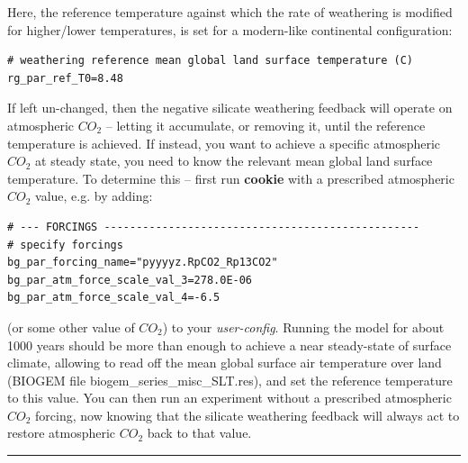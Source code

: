 Here, the reference temperature against which  the rate of weathering is modified for higher/lower temperatures, is set for a modern-like continental configuration:
\vspace{-1mm}\small\begin{verbatim}
# weathering reference mean global land surface temperature (C)
rg_par_ref_T0=8.48
\end{verbatim}\normalsize\vspace{-1mm}
If left un-changed, then the negative silicate weathering feedback will operate on atmospheric \(CO_{2}\) -- letting it accumulate, or removing it, until the reference temperature is achieved. If instead, you want to achieve a specific atmospheric \(CO_{2}\) at steady state, you need to know the relevant mean global land surface temperature. To determine this -- first run \textbf{cookie} with a prescribed atmospheric \(CO_{2}\) value, e.g. by adding:
\vspace{-1mm}\small\begin{verbatim}
# --- FORCINGS -------------------------------------------------
# specify forcings
bg_par_forcing_name="pyyyyz.RpCO2_Rp13CO2"
bg_par_atm_force_scale_val_3=278.0E-06
bg_par_atm_force_scale_val_4=-6.5
\end{verbatim}\normalsize\vspace{-1mm}
(or some other value of \(CO_{2}\)) to your \textit{user-config}. Running the model for about 1000 years should be more than enough to achieve a near steady-state of surface climate, allowing to read off the mean global surface air temperature over land (BIOGEM file \textsf{\footnotesize biogem\_series\_misc\_SLT.res}), and set the reference temperature to this value. You can then run an experiment without a prescribed atmospheric \(CO_{2}\) forcing, now knowing that the silicate weathering feedback will always act to restore atmospheric \(CO_{2}\) back to that value.

\vspace{1mm}\noindent\rule{4cm}{0.1mm}\vspace{2mm}

